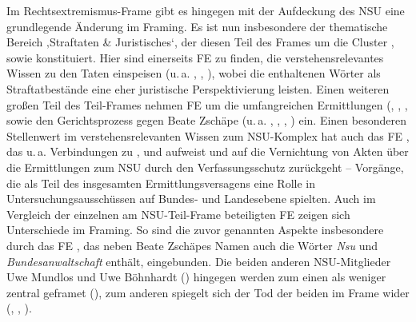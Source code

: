 Im Rechtsextremismus-Frame gibt es hingegen mit der Aufdeckung des NSU eine grundlegende Änderung im Framing. Es ist nun insbesondere der thematische Bereich ‚Straftaten \& Juristisches`, der diesen Teil des Frames um die Cluster ,  sowie  konstituiert. Hier sind einerseits FE zu finden, die verstehensrelevantes Wissen zu den Taten einspeisen (u.\,a. , , ), wobei die enthaltenen Wörter als Straftatbestände eine eher juristische Perspektivierung leisten. Einen weiteren großen Teil des Teil-Frames nehmen FE um die umfangreichen Ermittlungen (, , ,  sowie den Gerichtsprozess gegen Beate Zschäpe (u.\,a. , , , ) ein. Einen besonderen Stellenwert im verstehensrelevanten Wissen zum NSU-Komplex hat auch das FE , das u.\,a. Verbindungen zu ,  und  aufweist und auf die Vernichtung von Akten über die Ermittlungen zum NSU durch den Verfassungsschutz zurückgeht -- Vorgänge, die als Teil des insgesamten Ermittlungsversagens eine Rolle in Untersuchungsausschüssen auf Bundes- und Landesebene spielten. Auch im Vergleich der einzelnen am NSU-Teil-Frame beteiligten FE zeigen sich Unterschiede im Framing. So sind die zuvor genannten Aspekte insbesondere durch das FE , das neben Beate Zschäpes Namen auch die Wörter \emph{Nsu} und \emph{Bundesanwaltschaft} enthält, eingebunden. Die beiden anderen NSU-Mitglieder Uwe Mundlos und Uwe Böhnhardt () hingegen werden zum einen als weniger zentral geframet (), zum anderen spiegelt sich der Tod der beiden im Frame wider (, , ).

